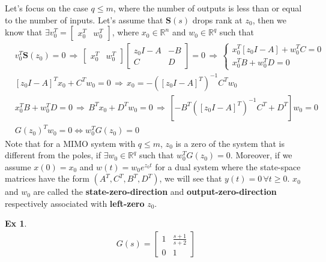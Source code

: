 \documentclass[twoside]{article}
\newtheorem{exmp}[theorem]{Ex}
\begin{document}
Let's focus on the case $q \leq m$, where the number of outputs is less than or equal to the number of inputs. 
Let's assume that $\mathbf{S}(s)$ drops rank at $z_0$, then we know that $\exists v_0^T = \begin{bmatrix} x_0^T & w_0^T \end{bmatrix}$, where $x_0 \in \mathbb{R}^{n}$ and $w_0 \in \mathbb{R}^q$ such that 
%
\begin{align*}
&v_0^T \mathbf{S}(z_0) = 0
\, \Rightarrow \,
\begin{bmatrix} x_0^T & w_0^T \end{bmatrix} \left[ \begin{array}{c|c} z_0 I - A & -B \\ \hline C & D \end{array} \right] = 0
\, \Rightarrow \,
 \begin{cases} x_0^T \left[ z_0 I - A \right] + w_0^T C = 0 \\ x_0^T B + w_0^T D = 0 \end{cases}
 \\
 &\left[ z_0 I - A \right]^T x_0 + C^T w_0 = 0 \, \Rightarrow \, x_0 =  -\left( \left[ z_0 I - A \right]^T \right)^{-1} C^T w_0
\\
&x_0^T B + w_0^T D = 0 \, \Rightarrow \, B^T x_0 + D^T w_0 = 0  \, \Rightarrow \, 
\left[ -B^T \left( \left[ z_0 I - A \right]^T \right)^{-1} C^T + D^T \right] w_0 = 0
\\
&G(z_0)^T w_0 =  0 \iff w_0^T G(z_0) = 0
\end{align*}
%
Note that for a MIMO system with $q \leq m$, $z_0$ is a zero of the system that is different from the poles, 
if $\exists w_0 \in \mathbb{R}^q$ such that $w_0^T G(z_0) = 0$. Moreover, if we 
assume $x(0) = x_0$ and $w(t) = w_0 e^{z_0 t}$ for a dual system where the state-space matrices have the form $(A^T,C^T,B^T,D^T)$, we will see that $y(t) = 0 \, \forall t \geq 0$. $x_0$ and $w_0$ are called the 
\textbf{state-zero-direction} and \textbf{output-zero-direction} respectively associated with \textbf{left-zero} $z_0$.

\begin{exmp}
	\begin{align*}
	G(s) = \begin{bmatrix} 1 & \frac{s+1}{s+2}  \\  
	0 & 1  \end{bmatrix}
	\end{align*}
\end{exmp}
\end{document}
